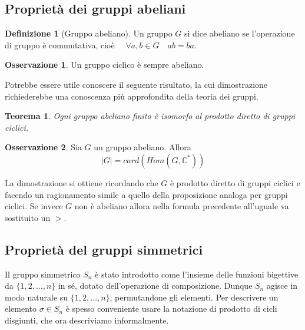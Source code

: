 \documentclass[11pt]{article}
\theoremstyle{plain}
\newtheorem{thm}{Teorema}[section]
\theoremstyle{definition}
\newtheorem{defn}{Definizione}[section]
\newtheorem*{rem}{Osservazione}
\theoremstyle{remark}
\newcommand{\C}{\mathbb{C}}
\begin{document}
\subsection{Proprietà dei gruppi abeliani}
\begin{defn}[Gruppo abeliano] Un gruppo $G$ si dice abeliano se l'operazione di gruppo è commutativa, cioè $\quad\forall a,b\in G\quad ab=ba$.
\end{defn}

\begin{rem} Un gruppo ciclico è sempre abeliano.
\end{rem}

Potrebbe essere utile conoscere il seguente risultato, la cui dimostrazione richiederebbe una conoscenza più approfondita della teoria dei gruppi.
\begin{thm}Ogni gruppo abeliano finito è isomorfo al prodotto diretto di gruppi ciclici.
\end{thm}

\begin{rem} Sia $G$ un gruppo abeliano. Allora 
\[ |G| = card(Hom(G,\C^*))\]

La dimostrazione si ottiene ricordando che $G$ è prodotto diretto di gruppi ciclici e facendo un ragionamento simile a quello
della proposizione analoga per gruppi ciclici.
Se invece $G$ non è abeliano allora nella formula precedente all'uguale va sostituito un $>$.
\end{rem}




\subsection{Proprietà del gruppi simmetrici}
Il gruppo simmetrico $S_n$ è stato introdotto come l'insieme delle funzioni bigettive da $\{1,2,\dots,n\}$ in sé, dotato dell'operazione di composizione.
Dunque $S_n$ agisce in modo naturale su $\{1,2,\dots,n\}$, permutandone gli elementi. Per descrivere un elemento $\sigma \in S_n$ 
è spesso conveniente usare la notazione di prodotto di cicli disgiunti, che ora descriviamo informalmente.
\end{document}
